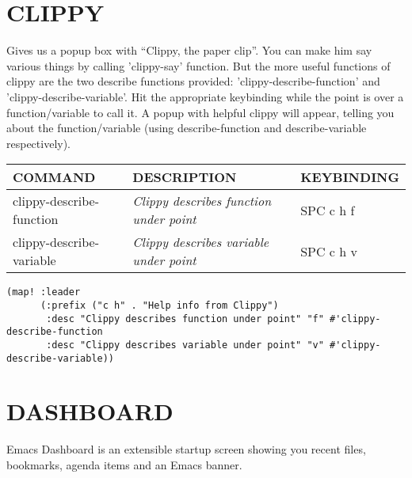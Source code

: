 \documentclass[11pt]{article}
\begin{document}
\section{CLIPPY}
\label{sec:org06ae620}
Gives us a popup box with ``Clippy, the paper clip''. You can make him say various things by calling 'clippy-say' function.  But the more useful functions of clippy are the two describe functions provided: 'clippy-describe-function' and 'clippy-describe-variable'.  Hit the appropriate keybinding while the point is over a function/variable to call it.  A popup with helpful clippy will appear, telling you about the function/variable (using describe-function and describe-variable respectively).

\begin{center}
\begin{tabular}{lll}
COMMAND & DESCRIPTION & KEYBINDING\\[0pt]
\hline
clippy-describe-function & \emph{Clippy describes function under point} & SPC c h f\\[0pt]
clippy-describe-variable & \emph{Clippy describes variable under point} & SPC c h v\\[0pt]
\end{tabular}
\end{center}

\begin{verbatim}
(map! :leader
      (:prefix ("c h" . "Help info from Clippy")
       :desc "Clippy describes function under point" "f" #'clippy-describe-function
       :desc "Clippy describes variable under point" "v" #'clippy-describe-variable))

\end{verbatim}

\section{DASHBOARD}
\label{sec:org90e942e}
Emacs Dashboard is an extensible startup screen showing you recent files, bookmarks, agenda items and an Emacs banner.
\end{document}
